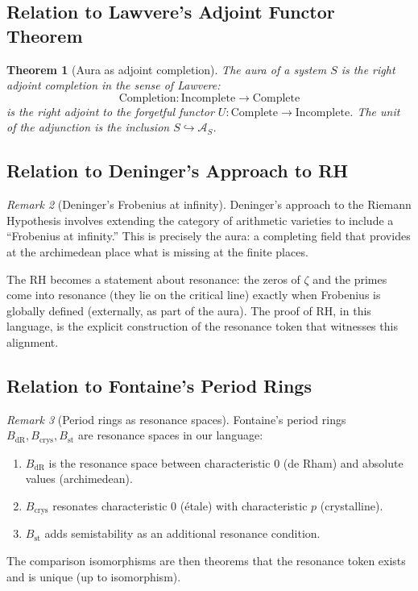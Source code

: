 \documentclass[12pt]{article}
\newtheorem{theorem}{Theorem}[section]
\theoremstyle{definition}
\theoremstyle{remark}
\newtheorem{remark}[theorem]{Remark}
\begin{document}
\subsection{Relation to Lawvere's Adjoint Functor Theorem}

\begin{theorem}[Aura as adjoint completion]
The aura of a system $S$ is the right adjoint completion in the sense of Lawvere:
\[
\text{Completion} : \mathrm{Incomplete} \to \mathrm{Complete}
\]
is the right adjoint to the forgetful functor $U : \mathrm{Complete} \to \mathrm{Incomplete}$. The unit of the adjunction is the inclusion $S \hookrightarrow \mathcal{A}_S$.
\end{theorem}

\subsection{Relation to Deninger's Approach to RH}

\begin{remark}[Deninger's Frobenius at infinity]
Deninger's approach to the Riemann Hypothesis involves extending the category of arithmetic varieties to include a ``Frobenius at infinity.'' This is precisely the aura: a completing field that provides at the archimedean place what is missing at the finite places.

The RH becomes a statement about resonance: the zeros of $\zeta$ and the primes come into resonance (they lie on the critical line) exactly when Frobenius is globally defined (externally, as part of the aura). The proof of RH, in this language, is the explicit construction of the resonance token that witnesses this alignment.
\end{remark}

\subsection{Relation to Fontaine's Period Rings}

\begin{remark}[Period rings as resonance spaces]
Fontaine's period rings $B_{\mathrm{dR}}, B_{\mathrm{crys}}, B_{\mathrm{st}}$ are resonance spaces in our language:
\begin{enumerate}
\item $B_{\mathrm{dR}}$ is the resonance space between characteristic $0$ (de Rham) and absolute values (archimedean).
\item $B_{\mathrm{crys}}$ resonates characteristic $0$ (\'etale) with characteristic $p$ (crystalline).
\item $B_{\mathrm{st}}$ adds semistability as an additional resonance condition.
\end{enumerate}

The comparison isomorphisms are then theorems that the resonance token exists and is unique (up to isomorphism).
\end{remark}
\end{document}
